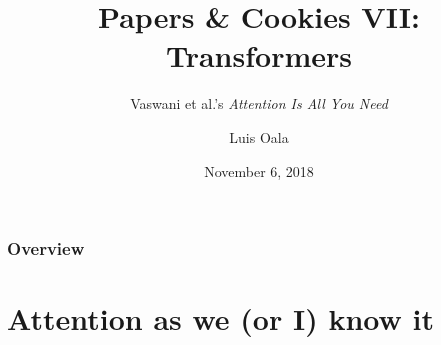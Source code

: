 \documentclass{beamer}
\title[Transformers]{Papers \& Cookies VII: Transformers} %
\subtitle{Vaswani et al.'s \textit{Attention Is All You Need}}
\author{Luis Oala} %
\institute[ML Group @ Fraunhofer HHI] %
{
ML Group @ Fraunhofer HHI \\ %
}
\date{November 6, 2018} %
\begin{document}
\begin{frame}


\maketitle
	
\end{frame}

\begin{frame}
\frametitle{Overview} %
\tableofcontents %
\end{frame}


\section{Attention as we (or I) know it} %
\end{document}

